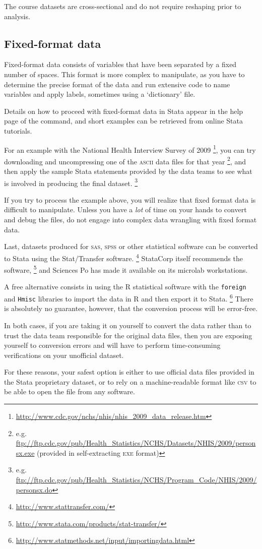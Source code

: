 The course datasets are cross-sectional and do not require reshaping prior to analysis.

%
\subsection{Fixed-format data}

Fixed-format data consists of variables that have been separated by a fixed number of spaces. This format is more complex to manipulate, as you have to determine the precise format of the data and run extensive code to name variables and apply labels, sometimes using a `dictionary' file.
    
Details on how to proceed with fixed-format data in Stata appear in the help page of the  command, and short examples can be retrieved from online Stata tutorials.
    
For an example with the National Health Interview Survey of 2009%
\footnote{\url{http://www.cdc.gov/nchs/nhis/nhis_2009_data_release.htm}}, %
you can try downloading and uncompressing one of the \textsc{ascii} data files for that year%
\footnote{e.g. \url{ftp://ftp.cdc.gov/pub/Health_Statistics/NCHS/Datasets/NHIS/2009/personsx.exe} (provided in self-extracting \textsc{exe} format)}, %
and then apply the sample Stata statements provided by the data teams to see what is involved in producing the final dataset.%
\footnote{e.g. \url{ftp://ftp.cdc.gov/pub/Health_Statistics/NCHS/Program_Code/NHIS/2009/personsx.do}}
    
    If you try to process the example above, you will realize that fixed format data is difficult to manipulate. %
    Unless you have a \emph{lot} of time on your hands to convert and debug the files, do not engage into complex data wrangling with fixed format data.


Last, datasets produced for \textsc{sas}, \textsc{spss} or other statistical software can be converted to Stata using the Stat/Transfer software.%
  \footnote{\url{http://www.stattransfer.com/}} %
StataCorp itself recommends the software,%
  \footnote{\url{http://www.stata.com/products/stat-transfer/}} %
and Sciences Po has made it available on its microlab workstations.

A free alternative consists in using the R statistical software with the \texttt{foreign} and \texttt{Hmisc} libraries to import the data in R and then export it to Stata.%
  \footnote{\url{http://www.statmethods.net/input/importingdata.html}} %
There is absolutely no guarantee, however, that the conversion process will be error-free.

In both cases, if you are taking it on yourself to convert the data rather than to trust the data team responsible for the original data files, then you are exposing yourself to conversion errors and will have to perform time-consuming verifications on your unofficial dataset.

For these reasons, your safest option is either to use official data files provided in the Stata proprietary dataset, or to rely on a machine-readable format like \textsc{csv} to be able to open the file from any software.
